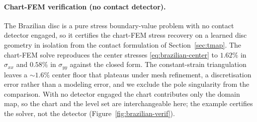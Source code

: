 \documentclass{svjour3}                 %
\begin{document}
\begin{appendix}
\paragraph{Chart-FEM verification (no contact detector).} The Brazilian disc is a pure stress boundary-value
problem with no contact detector engaged, so it certifies the chart-FEM stress recovery on a learned disc
geometry in isolation from the contact formulation of Section~\ref{sec:tmap}. The chart-FEM solve reproduces the
center stresses \eqref{eq:brazilian-center} to $1.62\%$ in $\sigma_{xx}$ and $0.58\%$ in $\sigma_{yy}$ against
the closed form. The constant-strain triangulation leaves a $\sim 1.6\%$ center floor that plateaus under
mesh refinement, a discretisation error rather than a modeling error, and we exclude the pole singularity from
the comparison. With no detector engaged the chart contributes only the domain map, so the chart and the level
set are interchangeable here; the example certifies the solver, not the detector
(Figure~\ref{fig:brazilian-verif}).


\end{appendix}
\end{document}

